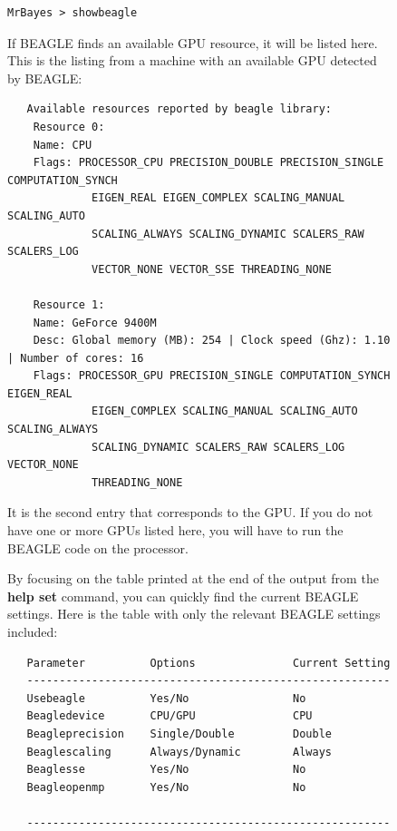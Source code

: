 \documentclass[12pt]{book}
\begin{document}
\begin{figure}[h]
\small
\begin{verbatim}
MrBayes > showbeagle
\end{verbatim}
\normalsize

If BEAGLE finds an available GPU resource, it will be listed here. This is the listing from a
machine with an available GPU detected by BEAGLE:

\footnotesize
\begin{singlespacing}
\begin{verbatim}
   Available resources reported by beagle library:
	Resource 0:
	Name: CPU
	Flags: PROCESSOR_CPU PRECISION_DOUBLE PRECISION_SINGLE COMPUTATION_SYNCH
             EIGEN_REAL EIGEN_COMPLEX SCALING_MANUAL SCALING_AUTO
             SCALING_ALWAYS SCALING_DYNAMIC SCALERS_RAW SCALERS_LOG
             VECTOR_NONE VECTOR_SSE THREADING_NONE

	Resource 1:
	Name: GeForce 9400M
	Desc: Global memory (MB): 254 | Clock speed (Ghz): 1.10 | Number of cores: 16
	Flags: PROCESSOR_GPU PRECISION_SINGLE COMPUTATION_SYNCH EIGEN_REAL
             EIGEN_COMPLEX SCALING_MANUAL SCALING_AUTO SCALING_ALWAYS
             SCALING_DYNAMIC SCALERS_RAW SCALERS_LOG VECTOR_NONE
             THREADING_NONE
\end{verbatim}
\end{singlespacing}
\normalsize

It is the second entry that corresponds to the GPU. If you do not have one or more GPUs listed
here, you will have to run the BEAGLE code on the processor.

By focusing on the table printed at the end of the output from the \textbf{help set} command, you
can quickly find the current BEAGLE settings. Here is the table with only the relevant BEAGLE
settings included:

\footnotesize
\begin{singlespacing}
\begin{verbatim}
   Parameter          Options               Current Setting
   --------------------------------------------------------
   Usebeagle          Yes/No                No             
   Beagledevice       CPU/GPU               CPU            
   Beagleprecision    Single/Double         Double         
   Beaglescaling      Always/Dynamic        Always         
   Beaglesse          Yes/No                No             
   Beagleopenmp       Yes/No                No             
                                                           
   --------------------------------------------------------
\end{verbatim}
\end{singlespacing}
\normalsize


\end{figure}
\end{document}
